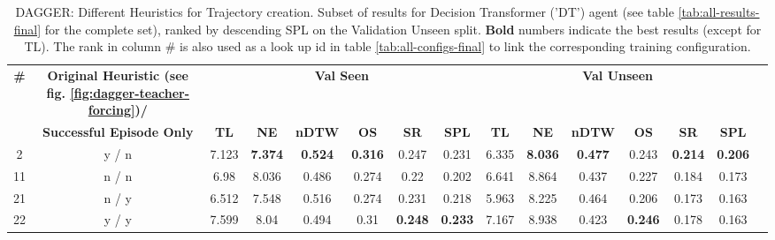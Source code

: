 \begin{table}
\centering
\caption{\label{tab:dt_dagger_pe_oa}DAGGER: Different Heuristics for Trajectory creation. Subset of results for Decision Transformer ('DT') agent (see table \ref{tab:all-results-final} for the complete set), ranked by descending SPL on the Validation Unseen split. \textbf{Bold} numbers indicate the best results (except for TL). The rank in column \# is also used as a look up id in table \ref{tab:all-configs-final} to link the corresponding training configuration.}
\begin{tabular}{@{\hskip3pt}c@{\hskip3pt}c@{\hskip3pt}c@{\hskip3pt}c@{\hskip3pt}c@{\hskip3pt}c@{\hskip3pt}c@{\hskip3pt}c@{\hskip3pt}c@{\hskip3pt}c@{\hskip3pt}c@{\hskip3pt}c@{\hskip3pt}c@{\hskip3pt}c@{\hskip3pt}c}
\toprule
                                  \textbf{\#} & \textbf{ Original Heuristic (see fig. \ref{fig:dagger-teacher-forcing})/} & \multicolumn{6}{c}{\textbf{Val Seen}} & \multicolumn{6}{c}{\textbf{Val Unseen}} \\
\cmidrule(l){3-8}\cmidrule(l){9-14}\textbf{~} &                                                                                          \textbf{Successful Episode Only} &       \textbf{TL} &     \textbf{NE} &   \textbf{nDTW} &     \textbf{OS} &     \textbf{SR} &    \textbf{SPL} &         \textbf{TL} &     \textbf{NE} &   \textbf{nDTW} &     \textbf{OS} &     \textbf{SR} &    \textbf{SPL} \\
\midrule
                                            2 &                                              y / n &             7.123 &  \textbf{7.374} &  \textbf{0.524} &  \textbf{0.316} &           0.247 &           0.231 &               6.335 &  \textbf{8.036} &  \textbf{0.477} &           0.243 &  \textbf{0.214} &  \textbf{0.206} \\
                                           11 &                                              n / n &              6.98 &           8.036 &           0.486 &           0.274 &            0.22 &           0.202 &               6.641 &           8.864 &           0.437 &           0.227 &           0.184 &           0.173 \\
                                           21 &                                              n / y &             6.512 &           7.548 &           0.516 &           0.274 &           0.231 &           0.218 &               5.963 &           8.225 &           0.464 &           0.206 &           0.173 &           0.163 \\
                                           22 &                                              y / y &             7.599 &            8.04 &           0.494 &            0.31 &  \textbf{0.248} &  \textbf{0.233} &               7.167 &           8.938 &           0.423 &  \textbf{0.246} &           0.178 &           0.163 \\
\bottomrule
\end{tabular}
\end{table}

